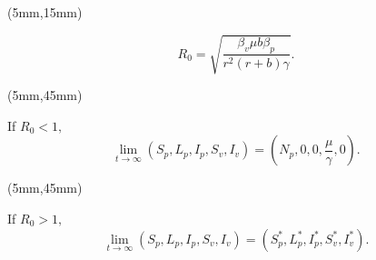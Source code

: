 	\begin{frame}
	
			\begin{textblock*}{50mm}(5mm,15mm)	
				\only<1,2,3>
				{
				\begin{greenbox}{}
					\begin{equation*}
					R_0=\sqrt{\frac{\beta_v\mu b\beta_p}{r^2(r+b)\gamma}}.
					\end{equation*}
				\end{greenbox}
				}
			{	
				\begin{textblock*}{70mm}(5mm,45mm)
					\begin{yellowbox}{}
					
						If $R_0<1,$
						\begin{equation*}
						\lim\limits_{t\rightarrow \infty}(S_p,L_p,I_p,S_v,I_v)=(N_p,0,0,\frac{\mu}{\gamma},0).
						\end{equation*}
					\end{yellowbox}
				\end{textblock*}
			}
				{
				\begin{textblock*}{70mm}(5mm,45mm)
					\begin{yellowbox}{}
					If $R_0>1,$
						\begin{equation*}
							\lim\limits_{t\rightarrow \infty}(S_p,L_p,I_p,S_v,I_v)=(S_p^*,L_p^*,I_p^*,S_v^*,I_v^*).
						\end{equation*}
				
					\end{yellowbox}
				\end{textblock*}
				}
			

\end{textblock*}
\end{frame}

